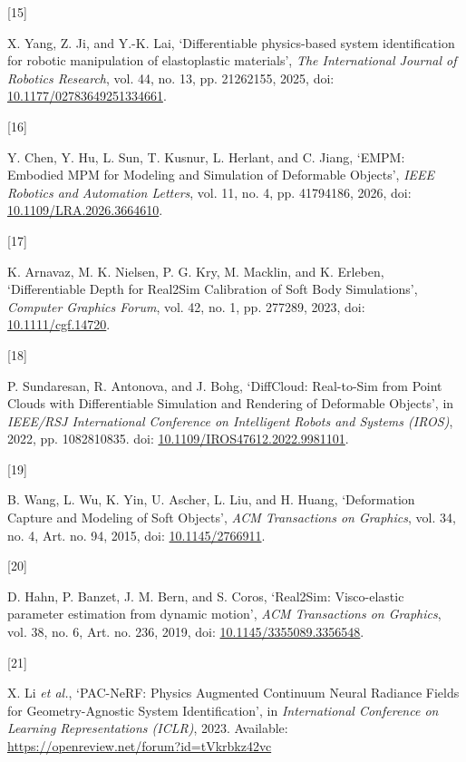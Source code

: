 \documentclass[
  11pt,
]{article}
\newlength{\cslhangindent}
\newlength{\csllabelwidth}
\newenvironment{CSLReferences}[2] %
 {\begin{list}{}{%
  \setlength{\itemindent}{0pt}
  \setlength{\leftmargin}{0pt}
  \setlength{\parsep}{0pt}
  \ifodd #1
   \setlength{\leftmargin}{\cslhangindent}
   \setlength{\itemindent}{-1\cslhangindent}
  \fi
  \setlength{\itemsep}{#2\baselineskip}}}
 {\end{list}}
\newcommand{\CSLLeftMargin}[1]{\parbox[t]{\csllabelwidth}{\strut#1\strut}}
\newcommand{\CSLRightInline}[1]{\parbox[t]{\linewidth - \csllabelwidth}{\strut#1\strut}}
\begin{document}
\begin{CSLReferences}{0}{0}
\CSLLeftMargin{{[}15{]} }%
\CSLRightInline{X. Yang, Z. Ji, and Y.-K. Lai, {`Differentiable
physics-based system identification for robotic manipulation of
elastoplastic materials'}, \emph{The International Journal of Robotics
Research}, vol. 44, no. 13, pp. 2126\textendash{}\allowbreak{}2155,
2025, doi:
\href{https://doi.org/10.1177/02783649251334661}{10.1177/02783649251334661}.}

\CSLLeftMargin{{[}16{]} }%
\CSLRightInline{Y. Chen, Y. Hu, L. Sun, T. Kusnur, L. Herlant, and C.
Jiang, {`EMPM: Embodied MPM for Modeling and Simulation of Deformable
Objects'}, \emph{IEEE Robotics and Automation Letters}, vol. 11, no. 4,
pp. 4179\textendash{}\allowbreak{}4186, 2026, doi:
\href{https://doi.org/10.1109/LRA.2026.3664610}{10.1109/LRA.2026.3664610}.}

\CSLLeftMargin{{[}17{]} }%
\CSLRightInline{K. Arnavaz, M. K. Nielsen, P. G. Kry, M. Macklin, and K.
Erleben, {`Differentiable Depth for Real2Sim Calibration of Soft Body
Simulations'}, \emph{Computer Graphics Forum}, vol. 42, no. 1, pp.
277\textendash{}\allowbreak{}289, 2023, doi:
\href{https://doi.org/10.1111/cgf.14720}{10.1111/cgf.14720}.}

\CSLLeftMargin{{[}18{]} }%
\CSLRightInline{P. Sundaresan, R. Antonova, and J. Bohg, {`DiffCloud:
Real-to-Sim from Point Clouds with Differentiable Simulation and
Rendering of Deformable Objects'}, in \emph{IEEE/RSJ International
Conference on Intelligent Robots and Systems (IROS)}, 2022, pp.
10828\textendash{}\allowbreak{}10835. doi:
\href{https://doi.org/10.1109/IROS47612.2022.9981101}{10.1109/IROS47612.2022.9981101}.}

\CSLLeftMargin{{[}19{]} }%
\CSLRightInline{B. Wang, L. Wu, K. Yin, U. Ascher, L. Liu, and H. Huang,
{`Deformation Capture and Modeling of Soft Objects'}, \emph{ACM
Transactions on Graphics}, vol. 34, no. 4, Art. no. 94, 2015, doi:
\href{https://doi.org/10.1145/2766911}{10.1145/2766911}.}

\CSLLeftMargin{{[}20{]} }%
\CSLRightInline{D. Hahn, P. Banzet, J. M. Bern, and S. Coros,
{`Real2Sim: Visco-elastic parameter estimation from dynamic motion'},
\emph{ACM Transactions on Graphics}, vol. 38, no. 6, Art. no. 236, 2019,
doi:
\href{https://doi.org/10.1145/3355089.3356548}{10.1145/3355089.3356548}.}

\CSLLeftMargin{{[}21{]} }%
\CSLRightInline{X. Li \emph{et al.}, {`PAC-NeRF: Physics Augmented
Continuum Neural Radiance Fields for Geometry-Agnostic System
Identification'}, in \emph{International Conference on Learning
Representations (ICLR)}, 2023. Available:
\url{https://openreview.net/forum?id=tVkrbkz42vc}}


\end{CSLReferences}
\end{document}
